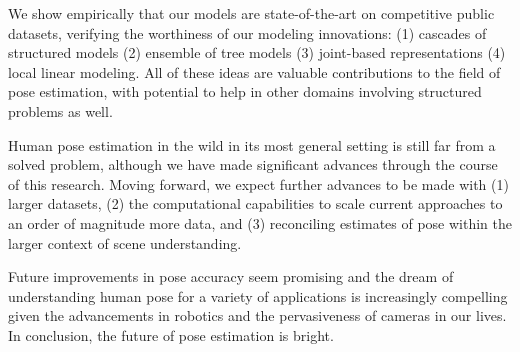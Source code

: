 We show empirically that our models are state-of-the-art on competitive public 
datasets, verifying the worthiness of our modeling innovations: (1) cascades of 
structured models (2) ensemble of tree models (3) joint-based representations 
(4) local linear modeling.  All of these ideas are valuable contributions to 
the field of pose estimation, with potential to help in other domains involving 
structured problems as well.

Human pose estimation in the wild in its most general setting is still far from 
a solved problem, although we have made significant advances through the course 
of this research.  Moving forward, we expect further advances to be made with 
(1) larger datasets, (2) the computational capabilities to scale current 
approaches to an order of magnitude more data, and (3) reconciling estimates of 
pose within the larger context of scene understanding.

Future improvements in pose accuracy seem promising and the dream of 
understanding human pose for a variety of applications is increasingly 
compelling given the advancements in robotics and the pervasiveness of cameras 
in our lives.  In conclusion, the future of pose estimation is bright.
